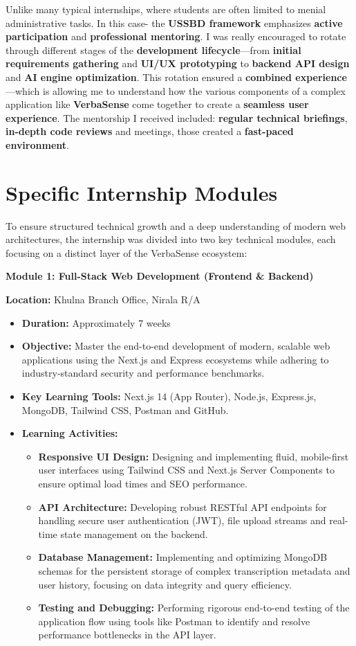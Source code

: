 \documentclass[oneside]{thesis-library}
\begin{document}
Unlike many typical internships, where students are often limited to menial administrative tasks. In this case- the \textbf{USSBD framework} emphasizes \textbf{active participation} and \textbf{professional mentoring}. I was really encouraged to rotate through different stages of the \textbf{development lifecycle}---from \textbf{initial requirements gathering} and \textbf{UI/UX prototyping} to \textbf{backend API design} and \textbf{AI engine optimization}. This rotation ensured a \textbf{combined experience}---which is allowing me to understand how the various components of a complex application like \textbf{VerbaSense} come together to create a \textbf{seamless user experience}. The mentorship I received included: \textbf{regular technical briefings}, \textbf{in-depth code reviews} and meetings, those created a \textbf{fast-paced environment}.

\section{Specific Internship Modules}
To ensure structured technical growth and a deep understanding of modern web architectures, the internship was divided into two key technical modules, each focusing on a distinct layer of the VerbaSense ecosystem:

{\large\textbf{Module 1: Full-Stack Web Development (Frontend \& Backend)}}

\textbf{Location:} Khulna Branch Office, Nirala R/A
\begin{itemize}
    \item \textbf{Duration:} Approximately 7 weeks
    \item \textbf{Objective:} Master the end-to-end development of modern, scalable web applications using the Next.js and Express ecosystems while adhering to industry-standard security and performance benchmarks.
    \item \textbf{Key Learning Tools:} Next.js 14 (App Router), Node.js, Express.js, MongoDB, Tailwind CSS, Postman and GitHub.
    \item \textbf{Learning Activities:}
    \begin{itemize}
        \item \textbf{Responsive UI Design:} Designing and implementing fluid, mobile-first user interfaces using Tailwind CSS and Next.js Server Components to ensure optimal load times and SEO performance.
        \item \textbf{API Architecture:} Developing robust RESTful API endpoints for handling secure user authentication (JWT), file upload streams and real-time state management on the backend.
        \item \textbf{Database Management:} Implementing and optimizing MongoDB schemas for the persistent storage of complex transcription metadata and user history, focusing on data integrity and query efficiency.
        \item \textbf{Testing and Debugging:} Performing rigorous end-to-end testing of the application flow using tools like Postman to identify and resolve performance bottlenecks in the API layer.
    \end{itemize}
\end{itemize}
\end{document}
